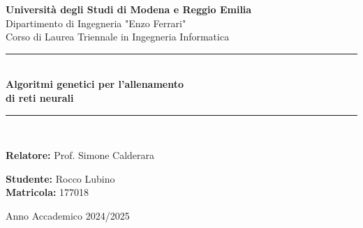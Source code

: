 \documentclass[12pt,a4paper,onecolumn,openright]{book}
\begin{document}
\begin{titlepage}
  \begin{center}
      {\Large \textbf{Università degli Studi di Modena e Reggio Emilia}} \\[2mm]
      {\large Dipartimento di Ingegneria "Enzo Ferrari"} \\[15mm]

      {\large Corso di Laurea Triennale in Ingegneria Informatica} \\[1cm]

      \rule{\textwidth}{0.5pt} \\[0cm]
      {\huge \textbf{Algoritmi genetici per l’allenamento \\ di reti neurali}} \\
      \rule{\textwidth}{0.5pt} \\[0.4cm]

    \vspace{9.cm}
      \begin{flushleft}
          \textbf{Relatore:} Prof. Simone Calderara \\[5mm]
      \end{flushleft}

      \begin{flushright}
          \textbf{Studente:} Rocco Lubino \\
          \textbf{Matricola:} 177018 \\
      \end{flushright}
      \vspace{2.cm}
      {\large Anno Accademico 2024/2025}
  \end{center}
\end{titlepage}


\newenvironment{compactitemize}{
\begin{itemize}[topsep=0pt, partopsep=0pt, itemsep=1.5pt, parsep=0pt]
}{\end{itemize}}


\pagestyle{frontmatter}
\tableofcontents
\newpage

\mainmatter
\pagestyle{mainmatter} %









\end{document}

